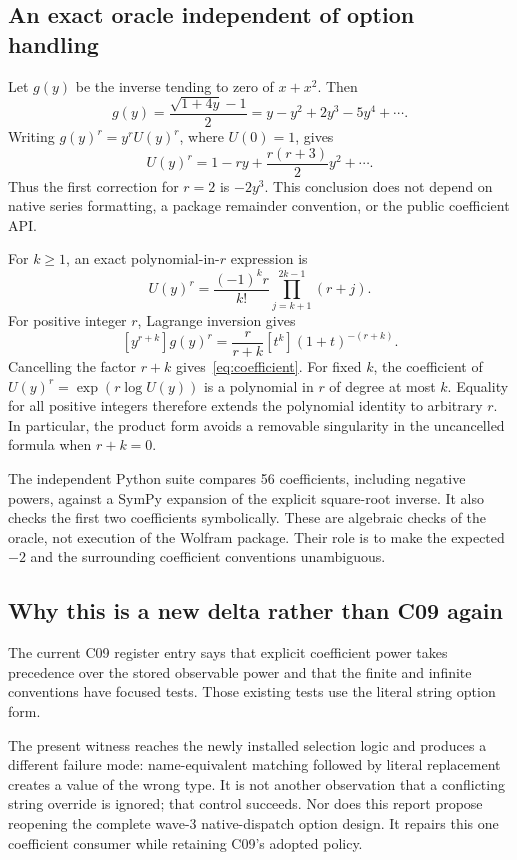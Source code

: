 \documentclass[11pt,letterpaper]{article}
\begin{document}
\subsection{An exact oracle independent of option handling}
Let $g(y)$ be the inverse tending to zero of $x+x^2$. Then
\[
 g(y)=\frac{\sqrt{1+4y}-1}{2}
     =y-y^2+2y^3-5y^4+\cdots.
\]
Writing $g(y)^r=y^r U(y)^r$, where $U(0)=1$, gives
\[
 U(y)^r=1-r y+\frac{r(r+3)}2 y^2+\cdots.
\]
Thus the first correction for $r=2$ is $-2y^3$. This conclusion does not depend on native series formatting, a package remainder convention, or the public coefficient API.

For $k\geq1$, an exact polynomial-in-$r$ expression is
\begin{equation}
 [y^k]U(y)^r
 =\frac{(-1)^k r}{k!}
   \prod_{j=k+1}^{2k-1}(r+j).
 \label{eq:coefficient}
\end{equation}
For positive integer $r$, Lagrange inversion gives
\[
 [y^{r+k}]g(y)^r
 =\frac{r}{r+k}[t^k](1+t)^{-(r+k)}.
\]
Cancelling the factor $r+k$ gives~\eqref{eq:coefficient}. For fixed $k$, the coefficient of $U(y)^r=\exp(r\log U(y))$ is a polynomial in $r$ of degree at most $k$. Equality for all positive integers therefore extends the polynomial identity to arbitrary $r$. In particular, the product form avoids a removable singularity in the uncancelled formula when $r+k=0$.

The independent Python suite compares 56 coefficients, including negative powers, against a SymPy expansion of the explicit square-root inverse. It also checks the first two coefficients symbolically. These are algebraic checks of the oracle, not execution of the Wolfram package. Their role is to make the expected $-2$ and the surrounding coefficient conventions unambiguous.

\subsection{Why this is a new delta rather than C09 again}
The current C09 register entry says that explicit coefficient power takes precedence over the stored observable power and that the finite and infinite conventions have focused tests. Those existing tests use the literal string option form.~\cite{status,coeftests}

The present witness reaches the newly installed selection logic and produces a different failure mode: name-equivalent matching followed by literal replacement creates a value of the wrong type. It is not another observation that a conflicting string override is ignored; that control succeeds. Nor does this report propose reopening the complete wave-3 native-dispatch option design. It repairs this one coefficient consumer while retaining C09's adopted policy.~\cite{wave3,core}
\end{document}
